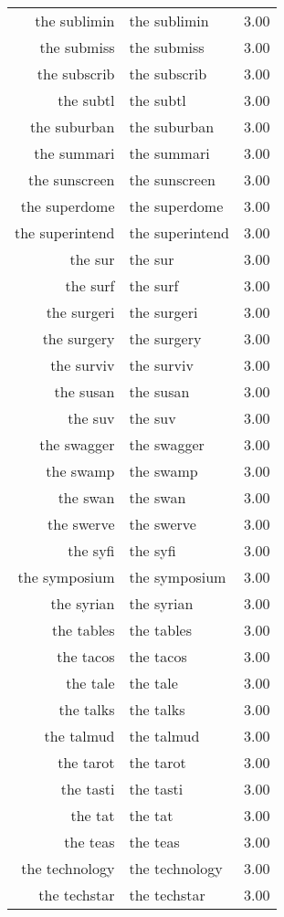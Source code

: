 \begin{table}[ht]
\begin{tabular}{rlr}
  the sublimin & the sublimin & 3.00 \\ 
  the submiss & the submiss & 3.00 \\ 
  the subscrib & the subscrib & 3.00 \\ 
  the subtl & the subtl & 3.00 \\ 
  the suburban & the suburban & 3.00 \\ 
  the summari & the summari & 3.00 \\ 
  the sunscreen & the sunscreen & 3.00 \\ 
  the superdome & the superdome & 3.00 \\ 
  the superintend & the superintend & 3.00 \\ 
  the sur & the sur & 3.00 \\ 
  the surf & the surf & 3.00 \\ 
  the surgeri & the surgeri & 3.00 \\ 
  the surgery & the surgery & 3.00 \\ 
  the surviv & the surviv & 3.00 \\ 
  the susan & the susan & 3.00 \\ 
  the suv & the suv & 3.00 \\ 
  the swagger & the swagger & 3.00 \\ 
  the swamp & the swamp & 3.00 \\ 
  the swan & the swan & 3.00 \\ 
  the swerve & the swerve & 3.00 \\ 
  the syfi & the syfi & 3.00 \\ 
  the symposium & the symposium & 3.00 \\ 
  the syrian & the syrian & 3.00 \\ 
  the tables & the tables & 3.00 \\ 
  the tacos & the tacos & 3.00 \\ 
  the tale & the tale & 3.00 \\ 
  the talks & the talks & 3.00 \\ 
  the talmud & the talmud & 3.00 \\ 
  the tarot & the tarot & 3.00 \\ 
  the tasti & the tasti & 3.00 \\ 
  the tat & the tat & 3.00 \\ 
  the teas & the teas & 3.00 \\ 
  the technology & the technology & 3.00 \\ 
  the techstar & the techstar & 3.00 \\ 

\end{tabular}
\end{table}
